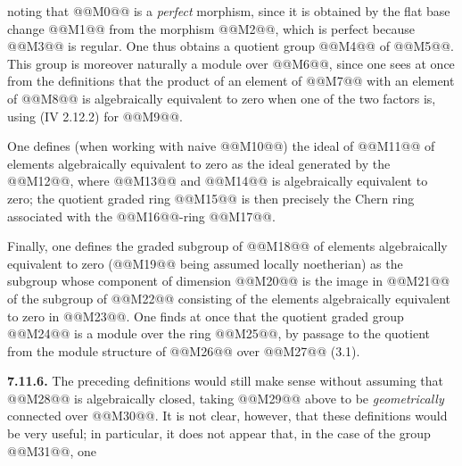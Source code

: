 
noting that @@M0@@ is a \emph{perfect} morphism, since it is obtained by the flat base change @@M1@@ from the morphism @@M2@@, which is perfect because @@M3@@ is regular. One thus obtains a quotient group
@@M4@@
of @@M5@@. This group is moreover naturally a module over @@M6@@, since one sees at once from the definitions that the product of an element of @@M7@@ with an element of @@M8@@ is algebraically equivalent to zero when one of the two factors is, using (IV 2.12.2) for @@M9@@.

One defines (when working with naive @@M10@@) the ideal of @@M11@@ of elements algebraically equivalent to zero as the ideal generated by the @@M12@@, where @@M13@@ and @@M14@@ is algebraically equivalent to zero; the quotient graded ring
@@M15@@
is then precisely the Chern ring associated with the @@M16@@-ring @@M17@@.

Finally, one defines the graded subgroup of @@M18@@ of elements algebraically equivalent to zero (@@M19@@ being assumed locally noetherian) as the subgroup whose component of dimension @@M20@@ is the image in @@M21@@ of the subgroup of @@M22@@ consisting of the elements algebraically equivalent to zero in @@M23@@. One finds at once that the quotient graded group
@@M24@@
is a module over the ring @@M25@@, by passage to the quotient from the module structure of @@M26@@ over @@M27@@ (3.1).

\textbf{7.11.6.} The preceding definitions would still make sense without assuming that @@M28@@ is algebraically closed, taking @@M29@@ above to be \emph{geometrically} connected over @@M30@@. It is not clear, however, that these definitions would be very useful; in particular, it does not appear that, in the case of the group @@M31@@, one
